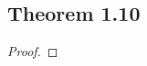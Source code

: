 \documentclass[../../main.tex]{subfiles}
\begin{document}
\subsection{Theorem 1.10}
\begin{wts}

\end{wts}
\begin{proof}

\end{proof}
\end{document}
